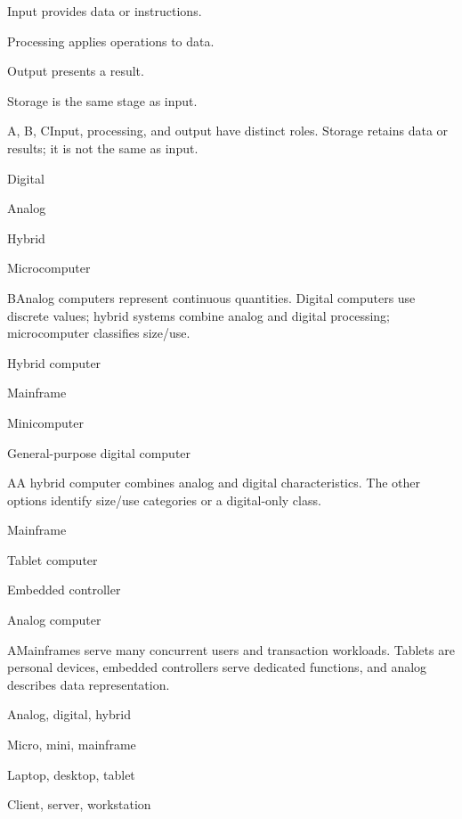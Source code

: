 \begin{enumerate}[label=\textbf{Q\arabic*.}, leftmargin=*]
  {\item Input provides data or instructions.
   \item Processing applies operations to data.
   \item Output presents a result.
   \item Storage is the same stage as input.}
  {A, B, C}{Input, processing, and output have distinct roles. Storage retains data or results; it is not the same as input.}
\fi
\ifnum{}
  {\item Digital
   \item Analog
   \item Hybrid
   \item Microcomputer}
  {B}{Analog computers represent continuous quantities. Digital computers use discrete values; hybrid systems combine analog and digital processing; microcomputer classifies size/use.}
  {\item Hybrid computer
   \item Mainframe
   \item Minicomputer
   \item General-purpose digital computer}
  {A}{A hybrid computer combines analog and digital characteristics. The other options identify size/use categories or a digital-only class.}
  {\item Mainframe
   \item Tablet computer
   \item Embedded controller
   \item Analog computer}
  {A}{Mainframes serve many concurrent users and transaction workloads. Tablets are personal devices, embedded controllers serve dedicated functions, and analog describes data representation.}
  {\item Analog, digital, hybrid
   \item Micro, mini, mainframe
   \item Laptop, desktop, tablet
   \item Client, server, workstation}

\end{enumerate}
